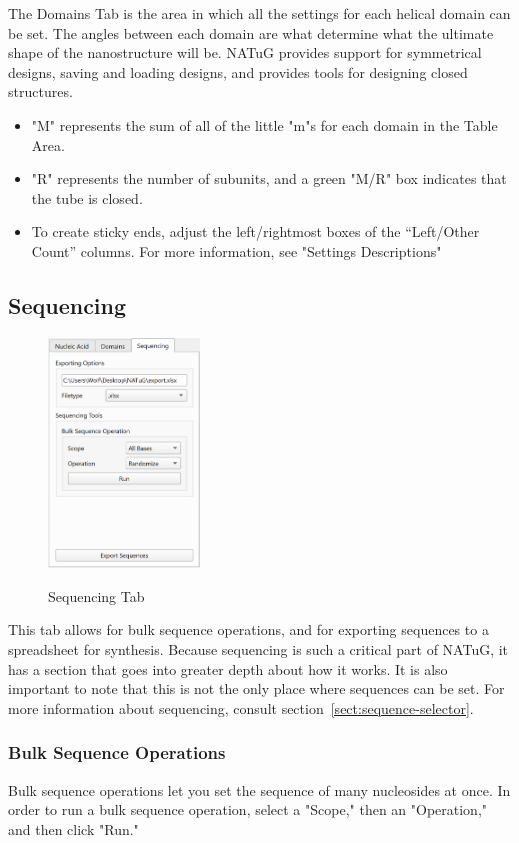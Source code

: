 \documentclass[titlepage]{article}
\begin{document}
	The Domains Tab is the area in which all the settings for each helical domain can be set. The angles between each domain are what determine what the ultimate shape of the nanostructure will be. NATuG provides support for symmetrical designs, saving and loading designs, and provides tools for designing closed structures.
	
	\begin{itemize}
		\item "M" represents the sum of all of the little "m"s for each domain in the Table Area.
		\item "R" represents the number of subunits, and a green "M/R" box indicates that the tube is closed.
		\item To create sticky ends, adjust the left/rightmost boxes of the “Left/Other Count” columns. For more information, see "Settings Descriptions"
	\end{itemize}
	
	\subsection{Sequencing}
	
	\begin{figure}
		\centering
		\caption{Sequencing Tab}
		\includegraphics[height=2.4in]{sequencing-tab.png}
		\label{fig:sequencing-tab}
	\end{figure}
	
	This tab allows for bulk sequence operations, and for exporting sequences to a spreadsheet for synthesis. Because sequencing is such a critical part of NATuG, it has a section that goes into greater depth about how it works. It is also important to note that this is not the only place where sequences can be set. For more information about sequencing, consult section~\ref{sect:sequence-selector}.
	
	\subsubsection{Bulk Sequence Operations}
	Bulk sequence operations let you set the sequence of many nucleosides at once. In order to run a bulk sequence operation, select a "Scope," then an "Operation," and then click "Run."
	
\end{document}
